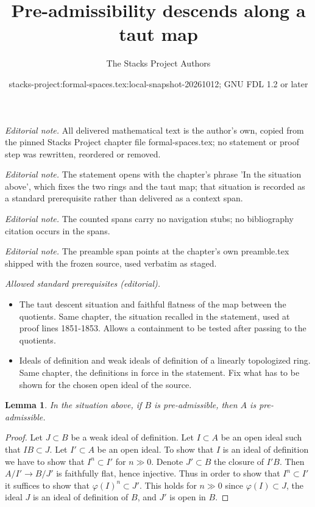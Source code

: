 \documentclass{stacks-project}
\title{Pre-admissibility descends along a taut map}
\author{The Stacks Project Authors}
\date{stacks-project:formal-spaces.tex:local-snapshot-20261012; GNU FDL 1.2 or later}
\theoremstyle{plain}
\newtheorem{lemma}[subsection]{Lemma}
\theoremstyle{definition}
\theoremstyle{remark}
\numberwithin{equation}{subsection}
\begin{document}
\maketitle
\noindent\textit{Editorial note.} All delivered mathematical text is the author's own, copied from the pinned Stacks Project chapter file formal-spaces.tex; no statement or proof step was rewritten, reordered or removed.\par\medskip
\noindent\textit{Editorial note.} The statement opens with the chapter's phrase 'In the situation above', which fixes the two rings and the taut map; that situation is recorded as a standard prerequisite rather than delivered as a context span.\par\medskip
\noindent\textit{Editorial note.} The counted spans carry no navigation stubs; no bibliography citation occurs in the spans.\par\medskip
\noindent\textit{Editorial note.} The preamble span points at the chapter's own preamble.tex shipped with the frozen source, used verbatim as staged.\par\medskip
\noindent\textit{Allowed standard prerequisites (editorial).}\begin{itemize}
\item The taut descent situation and faithful flatness of the map between the quotients. Same chapter, the situation recalled in the statement, used at proof lines 1851-1853. Allows a containment to be tested after passing to the quotients.
\item Ideals of definition and weak ideals of definition of a linearly topologized ring. Same chapter, the definitions in force in the statement. Fix what has to be shown for the chosen open ideal of the source.
\end{itemize}\medskip
\begin{lemma}
\label{lemma-taut-descent-admissible}
In the situation above, if $B$ is pre-admissible, then $A$
is pre-admissible.
\end{lemma}

\begin{proof}
Let $J \subset B$ be a weak ideal of definition. Let $I \subset A$
be an open ideal such that $IB \subset J$. Let $I' \subset A$ be an open ideal.
To show that $I$ is an ideal of definition we have to show that
$I^n \subset I'$ for $n \gg 0$. Denote $J' \subset B$ the closure
of $I'B$. Then $A/I' \to B/J'$ is faithfully flat, hence injective.
Thus in order to show that $I^n \subset I'$ it suffices to show
that $\varphi(I)^n \subset J'$. This holds for $n \gg 0$ since
$\varphi(I) \subset J$, the ideal $J$ is an ideal of definition of $B$,
and $J'$ is open in $B$.
\end{proof}
\end{document}
